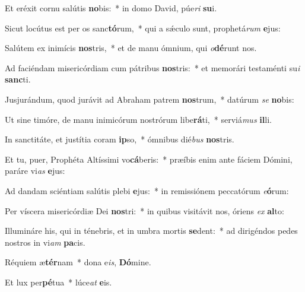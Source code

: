 \item Et eréxit cornu salútis \textbf{no}bis:~* in domo David, púe\textit{ri} \textbf{su}i.

\item Sicut locútus est per os sanc\textbf{tó}rum,~* qui a sǽculo sunt, prophetá\textit{rum} \textbf{e}jus:

\item Salútem ex inimícis \textbf{nos}tris,~* et de manu ómnium, qui \textit{o}\textbf{dé}runt nos.

\item Ad faciéndam misericórdiam cum pátribus \textbf{nos}tris:~* et memorári testaménti su\textit{i} \textbf{sanc}ti.

\item Jusjurándum, quod jurávit ad Abraham patrem \textbf{nos}trum,~* datúrum \textit{se} \textbf{no}bis:

\item Ut sine timóre, de manu inimicórum nostrórum libe\textbf{rá}ti,~* serviá\textit{mus} \textbf{il}li.

\item In sanctitáte, et justítia coram \textbf{ip}so,~* ómnibus dié\textit{bus} \textbf{nos}tris.

\item Et tu, puer, Prophéta Altíssimi vo\textbf{cá}beris:~* præíbis enim ante fáciem Dómini, paráre vi\textit{as} \textbf{e}jus:

\item Ad dandam sciéntiam salútis plebi \textbf{e}jus:~* in remissiónem peccatórum \textit{e}\textbf{ó}rum:

\item Per víscera misericórdiæ Dei \textbf{nos}tri:~* in quibus visitávit nos, óriens \textit{ex} \textbf{al}to:

\item Illumináre his, qui in ténebris, et in umbra mortis \textbf{se}dent:~* ad dirigéndos pedes nostros in vi\textit{am} \textbf{pa}cis.

\item Réquiem æ\textbf{tér}nam~* dona e\textit{is}, \textbf{Dó}mine.

\item Et lux per\textbf{pé}tua~* lúce\textit{at} \textbf{e}is.